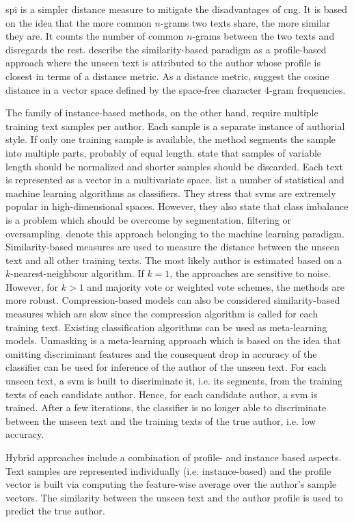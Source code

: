 \ac{spi} is a simpler distance measure to mitigate the disadvantages of \ac{cng}.
It is based on the idea that the more common $n$-grams two texts share, the more similar they are.
It counts the number of common $n$-grams between the two texts and disregards the rest.
\cite{koppel_authorship_2011} describe the similarity-based paradigm as a profile-based approach where the unseen text is attributed to the author whose profile is closest in terms of a distance metric.
As a distance metric, \citet{koppel_authorship_2011} suggest the cosine distance in a vector space defined by the space-free character 4-gram frequencies.

The family of instance-based methods, on the other hand, require multiple training text samples per author. 
Each sample is a separate instance of authorial style.
If only one training sample is available, the method segments the sample into multiple parts, probably of equal length.
\citet{stamatatos_survey_2009} state that samples of variable length should be normalized and 
shorter samples should be discarded.
Each text is represented as a vector in a multivariate space.
\citet{stamatatos_survey_2009} list a number of statistical and machine learning algorithms as classifiers.
They stress that \acp{svm} are extremely popular in high-dimensional spaces.
However, they also state that class imbalance is a problem 
which should be overcome by segmentation, filtering or oversampling.
\citet{koppel_authorship_2011} denote this approach belonging to the machine learning paradigm.
Similarity-based measures are used to measure the distance between the unseen text and all other training texts.
The most likely author is estimated based on a $k$-nearest-neighbour algorithm.
If $k=1$, the approaches are sensitive to noise.
However, for $k>1$ and majority vote or weighted vote schemes, the methods are more robust.
Compression-based models can also be considered similarity-based measures which are slow 
since the compression algorithm is called for each training text.
Existing classification algorithms can be used as meta-learning models.
Unmasking is a meta-learning approach which is based on the idea that
omitting discriminant features and the consequent drop in accuracy of the classifier 
can be used for inference of the author of the unseen text.
For each unseen text, a \ac{svm} is built to discriminate it, i.e. its segments, 
from the training texts of each candidate author.
Hence, for each candidate author, a \ac{svm} is trained.
After a few iterations, the classifier is no longer able to discriminate between the unseen text and 
the training texts of the true author, i.e. low accuracy.


Hybrid approaches include a combination of profile- and instance based aspects.
Text samples are represented individually (i.e. instance-based) and 
the profile vector is built via computing the feature-wise average over the author's sample vectors.
The similarity between the unseen text and the author profile is used to predict the true author.